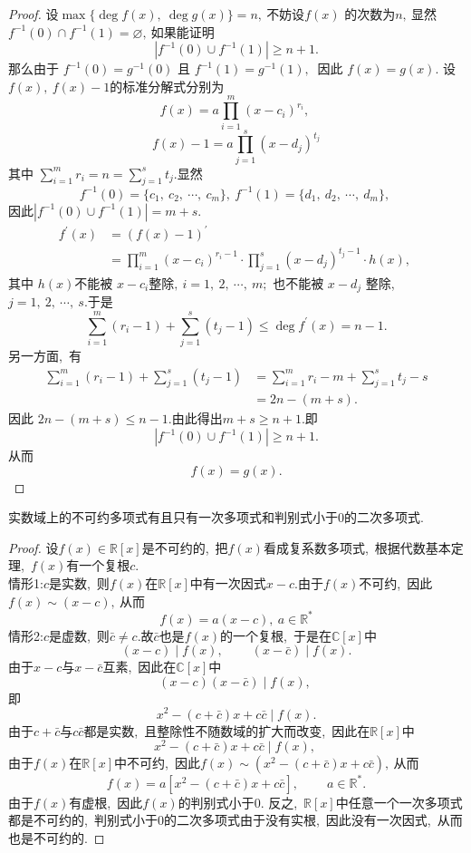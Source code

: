 \begin{proof}
	设$  \max \{\operatorname{deg} f(x) ,\  \operatorname{deg}  g(x)\}=n ,\  $不妨设$  f(x)$  的次数为$  n ,\  $显然 $ f^{-1}(0) \cap f^{-1}(1)=\varnothing ,\  $如果能证明
	$$\left|f^{-1}(0) \cup f^{-1}(1)\right| \geqslant n+1 .$$
	那么由于  $f^{-1}(0)=g^{-1}(0) $ 且 $ f^{-1}(1)=g^{-1}(1) ,\ $ 因此 $ f(x)=g(x)  .$
	设 $ f(x),\  f(x)-1  $的标准分解式分别为
	$$f(x)=a \prod_{i=1}^{m}\left(x-c_{i}\right)^{r_{i}},\  $$
	$$f(x)-1=a \prod_{j=1}^{s}\left(x-d_{j}\right)^{t_{j}} $$
	其中  $\sum\limits_{i=1}^{m} r_{i}=n=\sum\limits_{j=1}^{s} t_{j}  .$显然
	$$f^{-1}(0)=\{c_1,\ c_2,\ \cdots,\ c_m\},\ f^{-1}(1)=\{d_1,\ d_2,\ \cdots,\ d_m\},\ $$
	因此$\left|f^{-1}(0) \cup f^{-1}(1)\right|=m+s .$
	$$\begin{aligned}
		f^{\prime}(x) & =(f(x)-1)^{\prime} \\
		& =\prod_{i=1}^{m}\left(x-c_{i}\right)^{r_{i}-1} \cdot \prod_{j=1}^{s}\left(x-d_{j}\right)^{t_{j}-1} \cdot h(x),\ 
	\end{aligned}$$
	其中 $ h(x)  $不能被 $ x-c_{i}  $整除$,\   i=1,\ 2,\  \cdots,\  m ;$ 也不能被  $x-d_{j} $ 整除,\  $ j=1,\ 2,\  \cdots,\  s  .$于是
	$$\sum_{i=1}^{m}\left(r_{i}-1\right)+\sum_{j=1}^{s}\left(t_{j}-1\right) \leqslant \operatorname{deg} f^{\prime}(x)=n-1 .$$
	另一方面,\ 有
	$$\begin{aligned}
		\sum_{i=1}^{m}\left(r_{i}-1\right)+\sum_{j=1}^{s}\left(t_{j}-1\right) & =\sum_{i=1}^{m} r_{i}-m+\sum_{j=1}^{s} t_{j}-s \\
		& =2 n-(m+s) .
	\end{aligned}$$
	因此 $ 2 n-(m+s) \leqslant n-1  .$由此得出$  m+s \geqslant n+1  .$即
	$$\left|f^{-1}(0) \cup f^{-1}(1)\right| \geqslant n+1 .$$
	从而
	$$f(x)=g(x) .$$
\end{proof}
\newpage
\begin{theorem}
	实数域上的不可约多项式有且只有一次多项式和判别式小于$0$的二次多项式.
\end{theorem}
\begin{proof}
	设$f(x)\in\mathbb{R}[x]$是不可约的,\ 把$f(x)$看成复系数多项式,\ 根据代数基本定理,\ $f(x)$有一个复根$c.$\\
	情形1:$c$是实数,\ 则$f(x)$在$\mathbb{R}[x]$中有一次因式$x-c.$由于$f(x)$不可约,\ 因此$f(x)\sim (x-c),\ $从而
	$$f(x)=a(x-c),\ a\in\mathbb{R}^*$$
	情形2:$c$是虚数,\ 则$\bar{c}\neq c.$故$\bar{c}$也是$f(x)$的一个复根,\ 于是在$\mathbb{C}[x]$中
	$$(x-c)\mid f(x),\ \qquad (x-\bar{c})\mid f(x).$$
	由于$x-c$与$x-\bar{c}$互素,\ 因此在$\mathbb{C}[x]$中
	$$(x-c)(x-\bar{c})\mid f(x),\ $$
	即
	$$x^2-(c+\bar{c})x+c\bar{c}\mid f(x).$$
	由于$c+\bar{c}$与$c\bar{c}$都是实数,\ 且整除性不随数域的扩大而改变,\ 因此在$\mathbb{R}[x]$中
	$$x^2-(c+\bar{c})x+c\bar{c}\mid f(x),\ $$
	由于$f(x)$在$\mathbb{R}[x]$中不可约,\ 因此$f(x)\sim (x^2-(c+\bar{c})x+c\bar{c}),\ $从而
	$$f(x)=a[x^2-(c+\bar{c})x+c\bar{c}],\ \qquad a\in\mathbb{R}^{*}.$$
	由于$f(x)$有虚根,\ 因此$f(x)$的判别式小于$0.$
	反之,\ $\mathbb{R}[x]$中任意一个一次多项式都是不可约的,\ 判别式小于$0$的二次多项式由于没有实根,\ 因此没有一次因式,\ 从而也是不可约的.
\end{proof}
